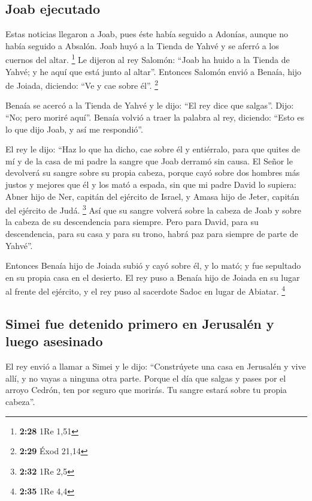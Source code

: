 \begin{paracol}{2}
\hypertarget{joab-ejecutado}{%
\subsection{Joab ejecutado}\label{joab-ejecutado}}

 Estas noticias llegaron a Joab, pues éste había seguido
a Adonías, aunque no había seguido a Absalón. Joab huyó a la Tienda de
Yahvé y se aferró a los cuernos del altar. \footnote{\textbf{2:28} 1Re
  1,51}  Le dijeron al rey Salomón: ``Joab ha huido a la
Tienda de Yahvé; y he aquí que está junto al altar''. Entonces Salomón
envió a Benaía, hijo de Joiada, diciendo: ``Ve y cae sobre él''.
\footnote{\textbf{2:29} Éxod 21,14}

 Benaía se acercó a la Tienda de Yahvé y le dijo: ``El
rey dice que salgas''. Dijo: ``No; pero moriré aquí''. Benaía volvió a
traer la palabra al rey, diciendo: ``Esto es lo que dijo Joab, y así me
respondió''.

 El rey le dijo: ``Haz lo que ha dicho, cae sobre él y
entiérralo, para que quites de mí y de la casa de mi padre la sangre que
Joab derramó sin causa.  El Señor le devolverá su sangre
sobre su propia cabeza, porque cayó sobre dos hombres más justos y
mejores que él y los mató a espada, sin que mi padre David lo supiera:
Abner hijo de Ner, capitán del ejército de Israel, y Amasa hijo de
Jeter, capitán del ejército de Judá. \footnote{\textbf{2:32} 1Re 2,5}
 Así que su sangre volverá sobre la cabeza de Joab y
sobre la cabeza de su descendencia para siempre. Pero para David, para
su descendencia, para su casa y para su trono, habrá paz para siempre de
parte de Yahvé''.

 Entonces Benaía hijo de Joiada subió y cayó sobre él, y
lo mató; y fue sepultado en su propia casa en el desierto.
 El rey puso a Benaía hijo de Joiada en su lugar al
frente del ejército, y el rey puso al sacerdote Sadoc en lugar de
Abiatar. \footnote{\textbf{2:35} 1Re 4,4}

\hypertarget{simei-fue-detenido-primero-en-jerusaluxe9n-y-luego-asesinado}{%
\subsection{Simei fue detenido primero en Jerusalén y luego
asesinado}\label{simei-fue-detenido-primero-en-jerusaluxe9n-y-luego-asesinado}}

 El rey envió a llamar a Simei y le dijo: ``Constrúyete
una casa en Jerusalén y vive allí, y no vayas a ninguna otra parte.
 Porque el día que salgas y pases por el arroyo Cedrón,
ten por seguro que morirás. Tu sangre estará sobre tu propia cabeza''.


\end{paracol}

